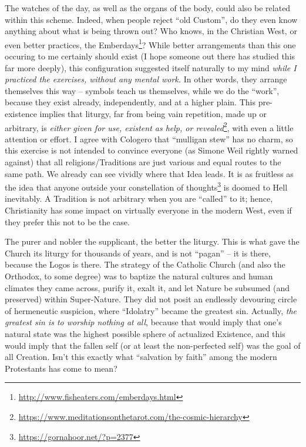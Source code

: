 The watches of the day, as well as the organs of the body, could also be related within this scheme. Indeed, when people reject ``old Custom'', do they even know anything about what is being thrown out? Who knows, in the Christian West, or even better practices, the Emberdays\footnote{\url{http://www.fisheaters.com/emberdays.html}}? While better arrangements than this one occuring to me certainly should exist (I hope someone out there has studied this far more deeply), this configuration suggested itself naturally to my mind \emph{while I practiced the exercises, without any mental work.} In other words, they arrange themselves this way -- symbols teach us themselves, while we do the ``work'', because they exist already, independently, and at a higher plain. This pre-existence implies that liturgy, far from being vain repetition, made up or arbitrary, is \emph{either given for use, existent as help, or revealed}\footnote{\url{https://www.meditationsonthetarot.com/the-cosmic-hierarchy}}, with even a little attention or effort. I agree with Cologero that ``mulligan stew'' has no charm, so this exercise is not intended to convince everyone (as Simone Weil rightly warned against) that all religions/Traditions are just various and equal routes to the same path. We already can see vividly where that Idea leads. It is as fruitless as the idea that anyone outside your constellation of thoughts\footnote{\url{https://gornahoor.net/?p=2377}} is doomed to Hell inevitably. A Tradition is not arbitrary when you are ``called'' to it; hence, Christianity has some impact on virtually everyone in the modern West, even if they prefer this not to be the case.

The purer and nobler the supplicant, the better the liturgy. This is what gave the Church its liturgy for thousands of years, and is not ``pagan'' -- it is there, because the Logos is there. The strategy of the Catholic Church (and also the Orthodox, to some degree) was to baptize the natural cultures and human climates they came across, purify it, exalt it, and let Nature be subsumed (and preserved) within Super-Nature. They did not posit an endlessly devouring circle of hermeneutic suspicion, where ``Idolatry'' became the greatest sin. Actually, \emph{the greatest sin is to worship nothing at all}, because that would imply that one's natural state was the highest possible sphere of actualized Existence, and this would imply that the fallen self (or at least the non-perfected self) was the goal of all Creation. Isn't this exactly what ``salvation by faith'' among the modern Protestants has come to mean?

